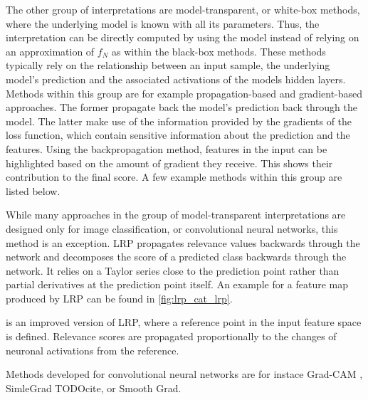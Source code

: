The other group of interpretations are model-transparent, or white-box methods, where the underlying model is known with all its parameters. Thus, the interpretation can be directly computed by using the model instead of relying on an approximation of $f_N$ as within the black-box methods. These methods typically rely on the relationship between an input sample, the underlying model's prediction and the associated activations of the models hidden layers. Methods within this group are for example propagation-based and gradient-based approaches. The former propagate back the model's prediction back through the model. The latter make use of the information provided by the gradients of the loss function, which contain sensitive information about the prediction and the features. Using the backpropagation method, features in the input can be highlighted based on the amount of gradient they receive. This shows their contribution to the final score. 
A few example methods within this group are listed below. 

 While many approaches in the group of model-transparent interpretations are designed only for image classification, or convolutional neural networks, this method \cite{bach2015pixel} is an exception. LRP propagates relevance values backwards through the network and decomposes the score of a predicted class backwards through the network. It relies on a Taylor series close to the prediction point rather than partial derivatives at the prediction point itself. An example for a feature map produced by LRP can be found in \autoref{fig:lrp_cat_lrp}.

 \cite{} is an improved version of LRP, where a reference point in the input feature space is defined. Relevance scores are propagated proportionally to the changes of neuronal activations from the reference. %

Methods developed for convolutional neural networks are for instace Grad-CAM \cite{selvaraju2017grad}, SimleGrad TODOcite, or Smooth Grad. 



